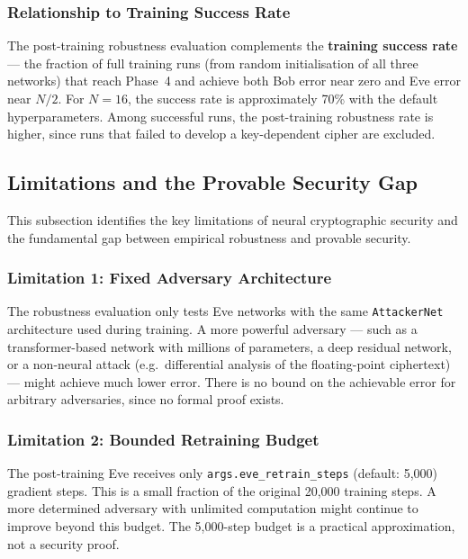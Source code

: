 \documentclass[12pt, a4paper]{article}
\newcommand{\code}[1]{\texttt{\color{CodeRed}#1}}
\begin{document}
\subsubsection*{Relationship to Training Success Rate}

The post-training robustness evaluation complements the
\textbf{training success rate} --- the fraction of full training runs
(from random initialisation of all three networks) that reach Phase~4
and achieve both Bob error near zero and Eve error near $N/2$. For
$N=16$, the success rate is approximately 70\% with the default
hyperparameters. Among successful runs, the post-training robustness
rate is higher, since runs that failed to develop a key-dependent cipher
are excluded.

\subsection{Limitations and the Provable Security Gap}
\label{subsec:security_limitations}

This subsection identifies the key limitations of neural cryptographic
security and the fundamental gap between empirical robustness and
provable security.

\subsubsection*{Limitation 1: Fixed Adversary Architecture}

The robustness evaluation only tests Eve networks with the same
\code{AttackerNet} architecture used during training. A more powerful
adversary --- such as a transformer-based network with millions of
parameters, a deep residual network, or a non-neural attack (e.g.\
differential analysis of the floating-point ciphertext) --- might
achieve much lower error. There is no bound on the achievable error
for arbitrary adversaries, since no formal proof exists.

\subsubsection*{Limitation 2: Bounded Retraining Budget}

The post-training Eve receives only \code{args.eve\_retrain\_steps}
(default: 5{,}000) gradient steps. This is a small fraction of the
original 20{,}000 training steps. A more determined adversary with
unlimited computation might continue to improve beyond this budget.
The 5{,}000-step budget is a practical approximation, not a
security proof.
\end{document}
